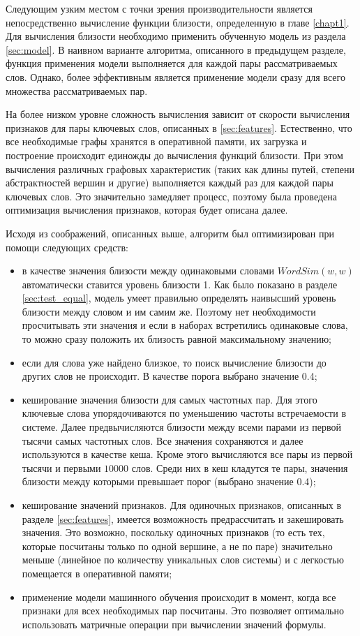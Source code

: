 Следующим узким местом с точки зрения производительности является непосредственно вычисление функции близости, определенную в главе \ref{chapt1}.  Для вычисления близости необходимо применить обученную модель из раздела \ref{sec:model}. В наивном варианте алгоритма, описанного в предыдущем разделе, функция применения модели выполняется для каждой пары рассматриваемых слов. Однако, более эффективным является применение модели сразу для всего множества рассматриваемых пар.

На более низком уровне сложность вычисления зависит от скорости вычисления признаков для пары ключевых слов, описанных в \ref{sec:features}. Естественно, что все необходимые графы хранятся в оперативной памяти, их загрузка и построение происходит единожды до вычисления функций близости. При этом вычисления различных графовых характеристик (таких как длины путей, степени абстрактностей вершин и другие) выполняется каждый раз для каждой пары ключевых слов. Это значительно замедляет процесс, поэтому была проведена оптимизация вычисления признаков, которая будет описана далее.

Исходя из соображений, описанных выше, алгоритм был оптимизирован при помощи следующих средств:
\begin{itemize}
    \item в качестве значения близости между одинаковыми словами $WordSim(w, w)$ автоматически ставится уровень близости 1. Как было показано в разделе \ref{sec:test_equal}, модель умеет правильно определять наивысший уровень близости между словом и им самим же. Поэтому нет необходимости просчитывать эти значения и если в наборах встретились одинаковые слова, то можно сразу положить их близость равной максимальному значению;
    \item если для слова уже найдено близкое, то поиск вычисление близости до других слов не происходит. В качестве порога выбрано значение 0.4;
    \item кеширование значения близости для самых частотных пар. Для этого ключевые слова упорядочиваются по уменьшению частоты встречаемости в системе. Далее предвычисляются близости между всеми парами из первой тысячи самых частотных слов. Все значения сохраняются и далее используются в качестве кеша. Кроме этого вычисляются все пары из первой тысячи и первыми $10000$ слов. Среди них в кеш кладутся те пары, значения близости между которыми превышает порог (выбрано значение 0.4);
    \item кеширование значений признаков. Для одиночных признаков, описанных в разделе \ref{sec:features}, имеется возможность предрассчитать и закешировать значения. Это возможно, поскольку одиночных признаков (то есть тех, которые посчитаны только по одной вершине, а не по паре) значительно меньше (линейное по количеству уникальных слов системы) и с легкостью помещается в оперативной памяти;
    \item применение модели машинного обучения происходит в момент, когда все признаки для всех необходимых пар посчитаны. Это позволяет оптимально использовать матричные операции при вычислении значений формулы.
\end{itemize}

